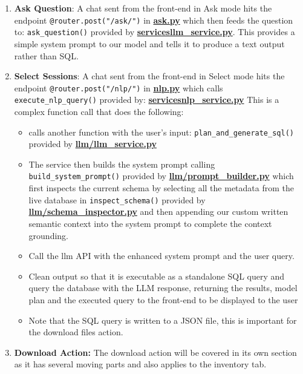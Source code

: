 \documentclass{article}
\begin{document}
\begin{enumerate}
  \item{\textbf{Ask Question}: A chat sent from the front-end in Ask mode hits the endpoint \texttt{@router.post("/ask/")} in \href{https://github.com/OCD-Rats-Capstone/OCD-Rat-Infrastructure/blob/main/src/ocd-rat-backend/routers/ask.py}{\textbf{ask.py}} which then feeds the question to: \texttt{ask\_question()} provided by \href{https://github.com/OCD-Rats-Capstone/OCD-Rat-Infrastructure/blob/main/src/ocd-rat-backend/llm/llm_service.py}{\textbf{services\/llm_service.py}}. This provides a simple system prompt to our model and tells it to produce a text output rather than SQL.}
  \item{\textbf{Select Sessions}: A chat sent from the front-end in Select mode hits the endpoint \texttt{@router.post("/nlp/")} in \href{https://github.com/OCD-Rats-Capstone/OCD-Rat-Infrastructure/blob/main/src/ocd-rat-backend/routers/nlp.py}{\textbf{nlp.py}} which calls \texttt{execute\_nlp\_query()} provided by: \href{https://github.com/OCD-Rats-Capstone/OCD-Rat-Infrastructure/blob/main/src/ocd-rat-backend/services/nlp_service.py}{\textbf{services\/nlp_service.py}} This is a complex function call that does the following:
        \begin{itemize}
          \item{calls another function with the user's input: \texttt{plan\_and\_generate\_sql()\newline} provided by \href{https://github.com/OCD-Rats-Capstone/OCD-Rat-Infrastructure/blob/main/src/ocd-rat-backend/llm/llm_service.py}{\textbf{llm/llm\_service.py}}}
          \item{The service then builds the system prompt calling \texttt{build\_system\_prompt()\newline} provided by \href{https://github.com/OCD-Rats-Capstone/OCD-Rat-Infrastructure/blob/main/src/ocd-rat-backend/llm/prompt_builder.py}{\textbf{llm/prompt\_builder.py}} which first inspects the current schema by selecting all the metadata from
          the live database in \texttt{inspect\_schema()} provided by \href{https://github.com/OCD-Rats-Capstone/OCD-Rat-Infrastructure/blob/main/src/ocd-rat-backend/llm/schema_inspector}{\textbf{llm/schema\_inspector.py}} and then appending our custom written semantic context into the system prompt to complete the context grounding.}
          \item{Call the llm API with the enhanced system prompt and the user query.}
          \item{Clean output so that it is executable as a standalone SQL query and query the database with the LLM response, returning the results, model plan and the executed query to the front-end to be displayed to the user}
          \item{Note that the SQL query is written to a JSON file, this is important for the download files action.}
        \end{itemize}}
  \item{\textbf{Download Action:} The download action will be covered in its own section as it has several moving parts and also applies to the inventory tab.}
\end{enumerate}
\end{document}
